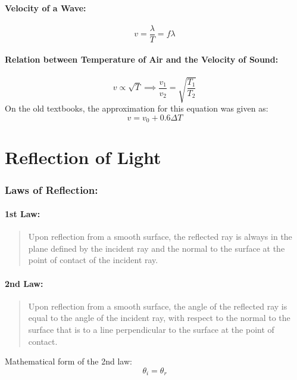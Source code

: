 \documentclass[a4paper]{report}
\begin{document}
        \subsubsection{Velocity of a Wave: }
            \begin{equation}
                v = \frac{\lambda}{T} = f \lambda
            \end{equation}
        \subsubsection{Relation between Temperature of Air and the Velocity of Sound: }
            \begin{equation}
                v \propto \sqrt{T} \implies \frac{v_1}{v_2} = \sqrt{\frac{T_1}{T_2}}
            \end{equation}
            On the old textbooks, the approximation for this equation was given as:
            \begin{equation}
                v = v_0 + 0.6 \Delta T
            \end{equation}


\chapter{Reflection of Light}
    \subsection{Laws of Reflection: }
        \subsubsection{1st Law:}
            \begin{quotation}
                Upon reflection from a smooth surface, the reflected ray is always in the plane defined by the incident ray and the normal to the surface at the point of contact of the incident ray.
            \end{quotation}
        \subsubsection{2nd Law:}
            \begin{quotation}
                Upon reflection from a smooth surface, the angle of the reflected ray is equal to the angle of the incident ray, with respect to the normal to the surface that is to a line perpendicular to the surface at the point of contact.
            \end{quotation}
            Mathematical form of the 2nd law:
            \begin{equation}
                \theta_i = \theta_r
            \end{equation}
\end{document}

